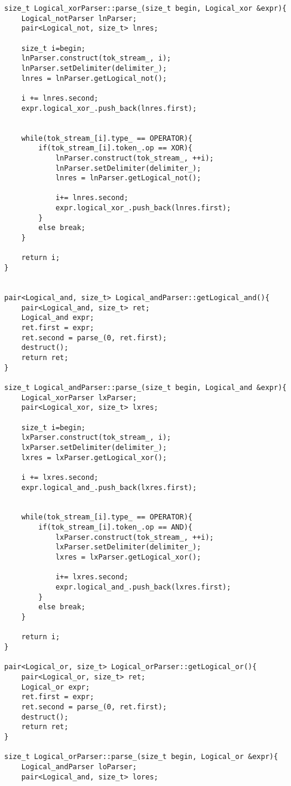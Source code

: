 \documentclass[pdftex,12pt,letterpaper,notitlepage,twoside]{article}
\begin{document}
\begin{lstlisting}[frame=single,caption={C program for testing}]
size_t Logical_xorParser::parse_(size_t begin, Logical_xor &expr){
    Logical_notParser lnParser;
    pair<Logical_not, size_t> lnres;

    size_t i=begin;
    lnParser.construct(tok_stream_, i);
    lnParser.setDelimiter(delimiter_);
    lnres = lnParser.getLogical_not();

    i += lnres.second;
    expr.logical_xor_.push_back(lnres.first);
    

    while(tok_stream_[i].type_ == OPERATOR){
        if(tok_stream_[i].token_.op == XOR){
            lnParser.construct(tok_stream_, ++i);
            lnParser.setDelimiter(delimiter_);
            lnres = lnParser.getLogical_not();
            
            i+= lnres.second;
            expr.logical_xor_.push_back(lnres.first);
        }
        else break;
    }

    return i;
}


pair<Logical_and, size_t> Logical_andParser::getLogical_and(){
    pair<Logical_and, size_t> ret;
    Logical_and expr;
    ret.first = expr;
    ret.second = parse_(0, ret.first);
    destruct();
    return ret;
}

size_t Logical_andParser::parse_(size_t begin, Logical_and &expr){
    Logical_xorParser lxParser;
    pair<Logical_xor, size_t> lxres;

    size_t i=begin;
    lxParser.construct(tok_stream_, i);
    lxParser.setDelimiter(delimiter_);
    lxres = lxParser.getLogical_xor();

    i += lxres.second;
    expr.logical_and_.push_back(lxres.first);
    

    while(tok_stream_[i].type_ == OPERATOR){
        if(tok_stream_[i].token_.op == AND){
            lxParser.construct(tok_stream_, ++i);
            lxParser.setDelimiter(delimiter_);
            lxres = lxParser.getLogical_xor();
            
            i+= lxres.second;
            expr.logical_and_.push_back(lxres.first);
        }
        else break;
    }

    return i;
}

pair<Logical_or, size_t> Logical_orParser::getLogical_or(){
    pair<Logical_or, size_t> ret;
    Logical_or expr;
    ret.first = expr;
    ret.second = parse_(0, ret.first);
    destruct();
    return ret;
}

size_t Logical_orParser::parse_(size_t begin, Logical_or &expr){
    Logical_andParser loParser;
    pair<Logical_and, size_t> lores;


\end{lstlisting}
\end{document}
